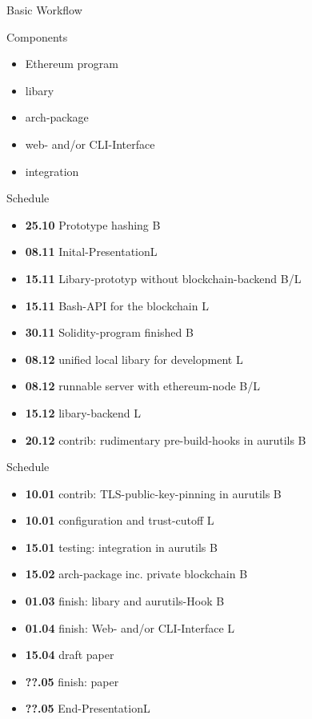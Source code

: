 \documentclass{beamer}
\begin{document}
\begin{frame}{Basic Workflow}
\end{frame}

\begin{frame}{Components}
\begin{itemize}
	\item Ethereum program
	\item libary
	\item arch-package
	\item web- and/or CLI-Interface
	\item integration
\end{itemize}

\end{frame}

\begin{frame}{Schedule}
\begin{itemize} 
	\item \textbf{25.10} Prototype hashing \hfill B
	\item \textbf{08.11} Inital-Presentation\hfill L
	\item \textbf{15.11} Libary-prototyp without blockchain-backend \hfill B/L
	\item \textbf{15.11} Bash-API for the blockchain \hfill L
	\item \textbf{30.11} Solidity-program finished \hfill B
	\item \textbf{08.12} unified local libary for development \hfill L
	\item \textbf{08.12} runnable server with ethereum-node \hfill B/L
	\item \textbf{15.12} libary-backend \hfill L
	\item \textbf{20.12} contrib: rudimentary pre-build-hooks in aurutils \hfill B
\end{itemize}
\end{frame}

\begin{frame}{Schedule}
\begin{itemize} 
	\item \textbf{10.01} contrib: TLS-public-key-pinning in aurutils \hfill B
	\item \textbf{10.01} configuration and trust-cutoff \hfill L
	\item \textbf{15.01} testing: integration in aurutils \hfill B
	\item \textbf{15.02} arch-package inc. private blockchain \hfill B
	\item \textbf{01.03} finish: libary and aurutils-Hook \hfill B
	\item \textbf{01.04} finish: Web- and/or CLI-Interface \hfill L
	\item \textbf{15.04} draft paper \hfill 
	\item \textbf{??.05} finish: paper\hfill 
	\item \textbf{??.05} End-Presentation\hfill L
\end{itemize}
\end{frame}
\end{document}
